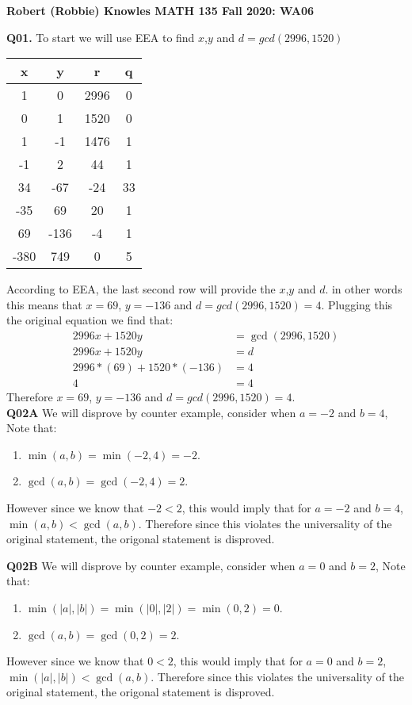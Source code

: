 \documentclass[11pt]{article}
\begin{document}
\parindent=0pt

\textbf{Robert (Robbie) Knowles MATH 135 Fall 2020: WA06}

\textbf{Q01.} To start we will use EEA to find $x$,$ y$ and $d = gcd(2996, 1520)$

\begin{center}
 \begin{tabular}{||c c c c||} 
 \hline
 x & y & r & q \\ [0.5ex] 
 \hline\hline
 1 & 0 & 2996 & 0 \\ 
 \hline
 0 & 1 & 1520 & 0 \\
 \hline
 1 & -1 & 1476 & 1 \\
 \hline
 -1 & 2 & 44 & 1 \\
 \hline
 34 &  -67 & -24 & 33 \\ 
 \hline
 -35 & 69  & 20 & 1 \\
 \hline
 69 &  -136 & -4 & 1 \\ 
 \hline
 -380 &  749 & 0 & 5\\ 
 \hline
\end{tabular}
\end{center}

According to EEA, the last second row will provide the $x$,$y$ and $d$. in other words this means that $x = 69$, $y = -136$ and $d= gcd(2996, 1520)=4$. Plugging this the original equation we find that:
\begin{align*}
2996x + 1520y &= \gcd(2996, 1520)\\
2996x + 1520y &= d \\
2996 * (69)+ 1520 * (-136) &= 4\\
4  &= 4
\end{align*}
Therefore  $x = 69$, $y = -136$ and $d= gcd(2996, 1520)=4$.\\

\textbf{Q02A} We will disprove by counter example, consider when  $a = -2$ and $b= 4$, Note that:
\begin{enumerate}
\item $\min(a, b) = \min(-2,4) = -2$.

\item$\gcd(a, b) = \gcd(-2,4) = 2$.
\end{enumerate}
However since we know that $-2 < 2$, this would imply that for  $a = -2$ and $b= 4$, $\min(a,b) < \gcd(a,b)$. Therefore since this violates the universality of the original statement, the origonal statement is disproved.

\textbf{Q02B} We will disprove by counter example, consider when  $a = 0$ and $b= 2$, Note that:
\begin{enumerate}
\item $\min(|a|, |b|) = \min(|0|,|2|) = \min(0,2) = 0$.

\item$\gcd(a, b) = \gcd(0,2) = 2$.
\end{enumerate}
However since we know that $0 < 2$, this would imply that for  $a = 0$ and $b= 2$, $\min(|a|,|b|) < \gcd(a,b)$. Therefore since this violates the universality of the original statement, the origonal statement is disproved.
\end{document}
